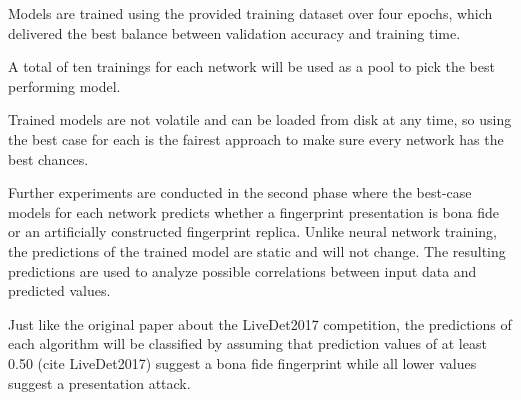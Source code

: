 Models are trained using the provided training dataset over four epochs, which delivered the best balance between validation accuracy and training time.

A total of ten trainings for each network will be used as a pool to pick the best performing model.

Trained models are not volatile and can be loaded from disk at any time, so using the best case for each is the fairest approach to make sure every network has the best chances.

Further experiments are conducted in the second phase where the best-case models for each network predicts whether a fingerprint presentation is bona fide or an artificially constructed fingerprint replica.
Unlike neural network training, the predictions of the trained model are static and will not change.
The resulting predictions are used to analyze possible correlations between input data and predicted values.

Just like the original paper about the LiveDet2017 competition, the predictions of each algorithm will be classified by assuming that prediction values of at least 0.50 (cite LiveDet2017) suggest a bona fide fingerprint while all lower values suggest a presentation attack.
